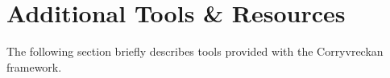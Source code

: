 \section{Additional Tools \& Resources}
\label{sec:additional_tools_resources}

The following section briefly describes tools provided with the Corryvreckan framework.

\label{sec:jobsub}
